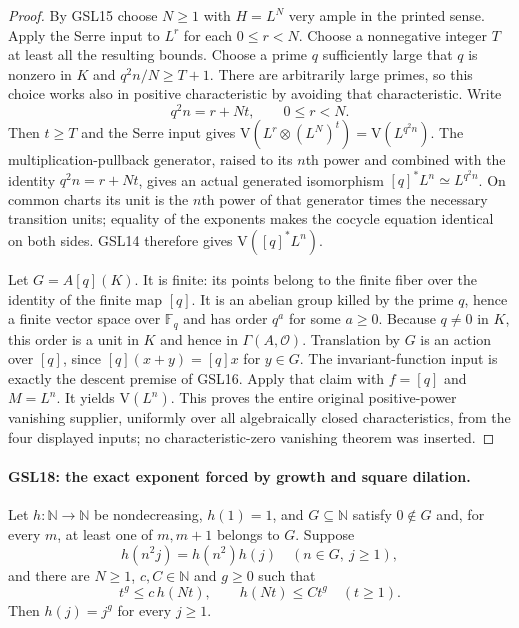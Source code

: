 \documentclass[11pt,a4paper]{article}
\numberwithin{equation}{section}
\theoremstyle{remark}\newtheorem{remark}[theorem]{Remark}
\begin{document}
\begin{proof}
By GSL15 choose $N\ge1$ with $H=L^N$ very ample in the printed
sense.  Apply the Serre input to $L^r$ for each
$0\le r<N$.  Choose a nonnegative integer $T$ at least all
the resulting bounds.  Choose a prime $q$ sufficiently large
that $q$ is nonzero in $K$ and $q^2n/N\ge T+1$.
There are arbitrarily large primes, so this choice works also
in positive characteristic by avoiding that characteristic.
Write
\[
 q^2n=r+Nt,\qquad 0\le r<N.
\]
Then $t\ge T$ and the Serre input gives
$\mathrm V(L^r\otimes(L^N)^t)=\mathrm V(L^{q^2n})$.
The multiplication-pullback generator, raised to its $n$th
power and combined with the identity $q^2n=r+Nt$, gives an
actual generated isomorphism
$[q]^*L^n\simeq L^{q^2n}$.  On common charts its unit is the
$n$th power of that generator times the necessary transition
units; equality of the exponents makes the cocycle equation
identical on both sides.  GSL14 therefore gives
$\mathrm V([q]^*L^n)$.

Let $G=A[q](K)$.  It is finite: its points belong to the finite
fiber over the identity of the finite map $[q]$.  It is an
abelian group killed by the prime $q$, hence a finite vector
space over $\mathbb F_q$ and has order $q^a$ for some $a\ge0$.
Because $q\ne0$ in $K$, this order is a unit in $K$ and hence
in $\Gamma(A,\mathcal O)$.  Translation by $G$ is an action
over $[q]$, since $[q](x+y)=[q]x$ for $y\in G$.
The invariant-function input is exactly the descent premise
of GSL16.  Apply that claim with $f=[q]$ and $M=L^n$.
It yields $\mathrm V(L^n)$.  This proves the entire original
positive-power vanishing supplier, uniformly over all
algebraically closed characteristics, from the four displayed
inputs; no characteristic-zero vanishing theorem was inserted.
\end{proof}

\paragraph{GSL18: the exact exponent forced by growth and square dilation.}
\label{claim:GSL18}
Let $h:\mathbb N\to\mathbb N$ be nondecreasing, $h(1)=1$, and
$G\subseteq\mathbb N$ satisfy $0\notin G$ and, for every $m$,
at least one of $m,m+1$ belongs to $G$.  Suppose
\[
 h(n^2j)=h(n^2)h(j)\quad(n\in G,\ j\ge1), \tag{GSL.9}
\]
and there are $N\ge1$, $c,C\in\mathbb N$ and $g\ge0$ such that
\[
 t^g\le c\,h(Nt),\qquad h(Nt)\le Ct^g\quad(t\ge1).
 \tag{GSL.10}
\]
Then $h(j)=j^g$ for every $j\ge1$.
\end{document}
